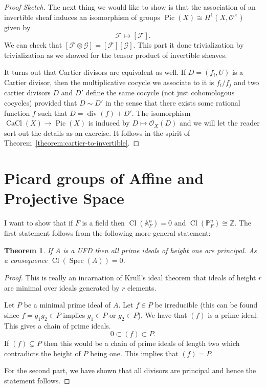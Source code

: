 \documentclass[12pt]{article}
\numberwithin{equation}{section}
\newtheorem{theorem}{Theorem}[subsection]
\theoremstyle{definition}
\theoremstyle{remark}
\newcommand{\ZZ}{\mathbb{Z}}
\newcommand{\Ocal}{\mathcal{O}}
\newcommand{\PP}{\mathbb{P}}
\renewcommand{\AA}{\mathbb{A}}
\newcommand{\Spec}{\operatorname{Spec}}
\newcommand{\CaCl}{\operatorname{CaCl}}
\newcommand{\Pic}{\operatorname{Pic}}
\renewcommand{\div}{\operatorname{div}}
\newcommand{\Cl}{\operatorname{Cl}}
\begin{document}
\begin{proof}[Proof Sketch]
	The next thing we would like to show is that the association of an invertible sheaf induces an isomorphism of groups $\Pic(X) \cong H^1(X,\mathcal O^{\times})$ given by
	$$ \mathcal F \mapsto [\mathcal F].$$ 
	We can check that $[\mathcal F\otimes\mathcal G] = [\mathcal F][\mathcal G]$.
	This part it done trivialization by trivialization as we showed for the tensor product of invertible sheaves.
	
	It turns out that Cartier divisors are equivalent as well. 
	If $D= (f_i,U )$ is a Cartier divisor, then the multiplicative cocycle we associate to it is $f_i/f_j$ and two cartier divisors $D$ and $D'$ define the same cocycle (not just cohomologous cocycles) provided that $D\sim D'$ in the sense that there exists some rational function $f$ such that $D= \div(f) + D'$.
	The isomorphism $\CaCl(X) \to \Pic(X)$ is induced by $D \mapsto \Ocal_X(D)$ and we will let the reader sort out the details as an exercise. 
	It follows in the spirit of Theorem~\ref{theorem:cartier-to-invertible}.
\end{proof}

\section{Picard groups of Affine and Projective Space}

I want to show that if $F$ is a field then $\Cl(\AA^n_F)=0$ and  $\Cl(\PP^n_F)\cong \ZZ$. 
The first statement follows from the following more general statement:
\begin{theorem}
	If $A$ is a UFD then all prime ideals of height one are principal. As a consequence $\Cl(\Spec(A))=0$.
\end{theorem}
\begin{proof}
	This is really an incarnation of Krull's ideal theorem that ideals of height $r$ are minimal over ideals generated by $r$ elements.
	
	Let $P$ be a minimal prime ideal of $A$. 
	Let $f \in P$ be irreducible (this can be found since $f=g_1g_2\in P$ implies $g_1\in P$ or $g_2\in P$). 
	We have that $(f)$ is a prime ideal. 
	This gives a chain of prime ideals.
	 $$ 0 \subset (f) \subset P. $$
	If $(f)\subsetneq P$ then this would be a chain of prime ideals of length two which contradicts the height of $P$ being one. 
	This implies that $(f) = P$.
	
	For the second part, we have shown that all divisors are principal and hence the statement follows.
\end{proof}
\end{document}
